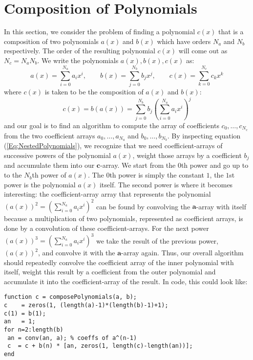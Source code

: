 \section{Composition of Polynomials}
In this section, we consider the problem of finding a polynomial $c(x)$ that is a composition of two polynomials $a(x)$ and $b(x)$ which have orders $N_a$ and $N_b$ respectively. The order of the resulting polynomial $c(x)$ will come out as $N_c = N_a N_b$. We write the polynomials $a(x), b(x), c(x)$ as:
\begin{equation}
  a(x) = \sum_{i=0}^{N_a} a_i x^i, \qquad
  b(x) = \sum_{j=0}^{N_b} b_j x^j, \qquad
  c(x) = \sum_{k=0}^{N_c} c_k x^k
\end{equation}
where $c(x)$ is taken to be the composition of $a(x)$ and $b(x)$:
\begin{equation}
 \label{Eq:NestedPolynomials}
 c(x) = b \left( a(x) \right) = \sum_{j=0}^{N_b} b_j \left( \sum_{i=0}^{N_a} a_i x^i \right)^j
\end{equation}
and our goal is to find an algorithm to compute the array of coefficients $c_0, \ldots, c_{N_c}$ from the two coefficient arrays  $a_0, \ldots, a_{N_a}$ and  $b_0, \ldots, b_{N_b}$. By inspecting equation (\ref{Eq:NestedPolynomials}), we recognize that we need coefficient-arrays of successive powers of the polynomial $a(x)$, weight those arrays by a coefficient $b_j$ and accumulate them into our $\mathbf{c}$-array. We start from the $0$th power and go up to to the $N_b$th power of $a(x)$. The $0$th power is simply the constant $1$, the $1$st power is the polynomial $a(x)$ itself. The second power is where it becomes interesting: the coefficient-array array that represents the polynomial $(a(x))^2 = (\sum_{i=0}^{N_a} a_i x^i)^2$ can be found by convolving the $\mathbf{a}$-array with itself because a multiplication of two polynomials, represented as coefficient arrays, is done by a convolution of these coefficient-arrays. For the next power $(a(x))^3 = (\sum_{i=0}^{N_a} a_i x^i)^3$ we  take the result of the previous power, $(a(x))^2$, and convolve it with the $\mathbf{a}$-array again. Thus, our overall algorithm should repeatedly convolve the coefficient array of the inner polynomial with itself, weight this result by a coefficient from the outer polynomial and accumulate it into the coefficient-array of the result. In code, this could look like:
\begin{verbatim}
function c = composePolynomials(a, b);
c    = zeros(1, (length(a)-1)*(length(b)-1)+1);
c(1) = b(1);
an   = 1;
for n=2:length(b)
 an = conv(an, a); % coeffs of a^(n-1)
 c  = c + b(n) * [an, zeros(1, length(c)-length(an))];
end
\end{verbatim}

